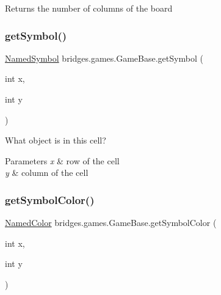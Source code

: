 \begin{DoxyReturn}{Returns}
the number of columns of the board 
\end{DoxyReturn}
\mbox{\label{classbridges_1_1games_1_1_game_base_ad7c48a1551044b5f2d0357448cdd3124}} 
\subsubsection{\texorpdfstring{get\+Symbol()}{getSymbol()}}
{\footnotesize\ttfamily \hyperlink{enumbridges_1_1base_1_1_named_symbol}{Named\+Symbol} bridges.\+games.\+Game\+Base.\+get\+Symbol (\begin{DoxyParamCaption}\item[{int}]{x,  }\item[{int}]{y }\end{DoxyParamCaption})\hspace{0.3cm}{\ttfamily [protected]}}



What object is in this cell? 


\begin{DoxyParams}{Parameters}
{\em x} & row of the cell \\
\hline
{\em y} & column of the cell \\
\hline
\end{DoxyParams}
\mbox{\label{classbridges_1_1games_1_1_game_base_a07d351db46d88b49471baa68eed23e54}} 
\subsubsection{\texorpdfstring{get\+Symbol\+Color()}{getSymbolColor()}}
{\footnotesize\ttfamily \hyperlink{enumbridges_1_1base_1_1_named_color}{Named\+Color} bridges.\+games.\+Game\+Base.\+get\+Symbol\+Color (\begin{DoxyParamCaption}\item[{int}]{x,  }\item[{int}]{y }\end{DoxyParamCaption})\hspace{0.3cm}{\ttfamily [protected]}}



